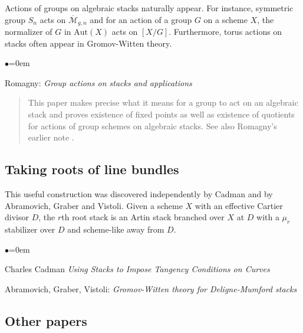 \noindent
Actions of groups on algebraic stacks naturally appear.
For instance, symmetric group $S_n$ acts on $\overline{\mathcal{M}}_{g, n}$
and for an action of a group $G$ on a scheme $X$, the normalizer of $G$ in
$\text{Aut}(X)$ acts on $[X/G]$.  Furthermore, torus actions on stacks
often appear in Gromov-Witten theory.
\begin{list}{$\bullet$}{\leftmargin=0em}
\item Romagny:  \emph{Group actions on stacks and applications}
\cite{romagny_actions}
\begin{quote}
This paper makes precise what it means for a group to act on an algebraic
stack and proves existence of fixed points as well as existence of quotients
for actions of group schemes on algebraic stacks.  See also Romagny's earlier
note \cite{romagny_notes}.
\end{quote}
\smallskip
\end{list}

\subsection{Taking roots of line bundles}
\label{subsection-root-stacks}

\noindent
This useful construction was discovered independently by Cadman and by
Abramovich, Graber and Vistoli.  Given a scheme $X$ with an effective Cartier
divisor $D$, the $r$th root stack is an Artin stack branched over $X$ at $D$
with a $\mu_r$ stabilizer over $D$ and scheme-like away from $D$.

\begin{list}{$\bullet$}{\leftmargin=0em}
\item Charles Cadman
\emph{Using Stacks to Impose Tangency Conditions on Curves}
\cite{cadman}
\smallskip
\item Abramovich, Graber, Vistoli: \emph{Gromov-Witten theory for
Deligne-Mumford stacks} \cite{agv}
\end{list}

\subsection{Other papers}
\label{subsection-other}

